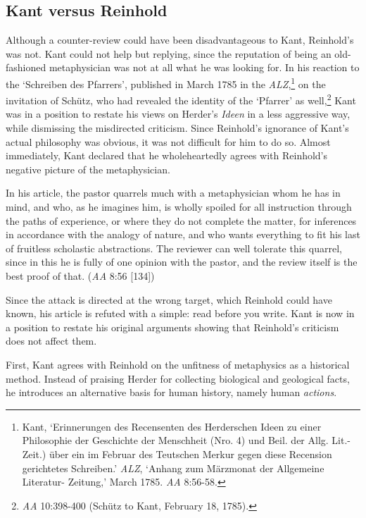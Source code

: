 \subsection{Kant versus Reinhold}


Although a counter{-}review could have been disadvantageous to Kant, Reinhold's was not. Kant could not help but replying, since the reputation of being an old{-}fashioned metaphysician was not at all what he was looking for. In his reaction to the `Schreiben des Pfarrers', published in March 1785 in the \textit{ALZ},\footnote{ Kant, `Erinnerungen des Recensenten des Herderschen Ideen zu einer Philosophie der Geschichte der Menschheit (Nro. 4) und Beil. der Allg. Lit.{-}Zeit.) \"{u}ber ein im Februar des Teutschen Merkur gegen diese Recension gerichtetes Schreiben.' \textit{ALZ}, `Anhang zum M\"{a}rzmonat der Allgemeine Literatur{-} Zeitung,' March 1785. \textit{AA} 8:56{-}58.} on the invitation of Sch\"{u}tz, who had revealed the identity of the `Pfarrer' as well,\footnote{\textit{AA} 10:398{-}400 (Sch\"{u}tz to Kant, February 18, 1785).} Kant was in a position to restate his views on Herder's \textit{Ideen }in a less aggressive way, while dismissing the misdirected criticism. Since Reinhold's ignorance of Kant's actual philosophy was obvious, it was not difficult for him to do so. Almost immediately, Kant declared that he wholeheartedly agrees with Reinhold's negative picture of the metaphysician.

In his article, the pastor quarrels much with a metaphysician whom he has in mind, and who, as he imagines him, is wholly spoiled for all instruction through the paths of experience, or where they do not complete the matter, for inferences in accordance with the analogy of nature, and who wants everything to fit his last of fruitless scholastic abstractions. The reviewer can well tolerate this quarrel, since in this he is fully of one opinion with the pastor, and the review itself is the best proof of that. (\textit{AA} 8:56 [134])

Since the attack is directed at the wrong target, which Reinhold could have known, his article is refuted with a simple: read before you write. Kant is now in a position to restate his original arguments showing that Reinhold's criticism does not affect them. 

First, Kant agrees with Reinhold on the unfitness of metaphysics as a historical method. Instead of praising Herder for collecting biological and geological facts, he introduces an alternative basis for human history, namely human \textit{actions}.

